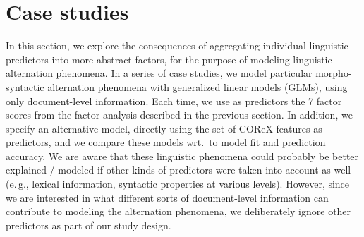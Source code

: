 \section{Case studies}
\label{sec:case-studies}
In this section, we explore the consequences of aggregating individual linguistic predictors into more abstract factors, for the purpose of modeling linguistic alternation phenomena.
In a series of case studies, we model particular morpho-syntactic alternation phenomena with generalized linear models (GLMs), using only document-level information.
Each time, we use as predictors the 7 factor scores from the factor analysis described in the previous section.
In addition, we specify an alternative model, directly using the set of COReX features as predictors, and we compare these models wrt.\ to model fit and prediction accuracy. 
We are aware that these linguistic phenomena could probably be better explained / modeled if other kinds of predictors were taken into account as well (e.\,g., lexical information, syntactic properties at various levels).
However, since we are interested in what different sorts of document-level information can contribute to modeling the alternation phenomena, we deliberately ignore other predictors as part of our study design.

